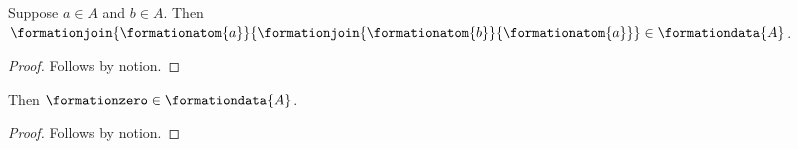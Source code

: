 

\begin{proposition}\label{formation_nested}
    Suppose $a\in A$ and $b\in A$.
    Then $\formationjoin{\formationatom{a}}{\formationjoin{\formationatom{b}}{\formationatom{a}}}\in\formationdata{A}$.
\end{proposition}
\begin{proof}
    Follows by notion.
\end{proof}

\begin{proposition}\label{formation_constant}
    Then $\formationzero\in\formationdata{A}$.
\end{proposition}
\begin{proof}
    Follows by notion.
\end{proof}
